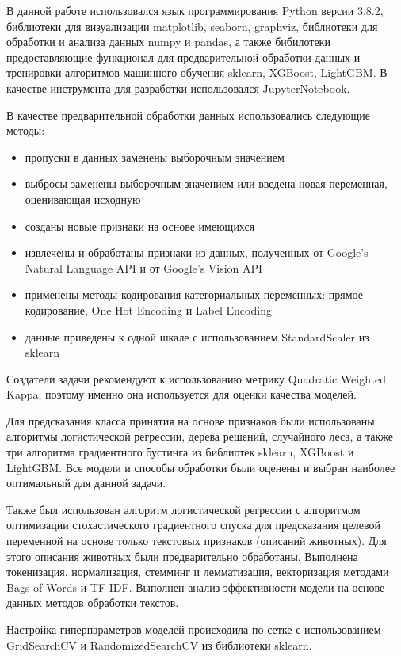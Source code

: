 \documentclass[14pt]{mmcs_article}
\begin{document}
В данной работе использовался язык программирования Python версии 3.8.2, библиотеки для визуализации matplotlib, seaborn, graphviz, библиотеки для обработки и анализа данных numpy и pandas, а также бибилотеки предоставляющие функционал для предварительной обработки данных и тренировки алгоритмов машинного обучения sklearn, XGBoost, LightGBM. В качестве инструмента для разработки использовался JupyterNotebook.

В качестве предварительной обработки данных использовались следующие методы: 
\begin{itemize}
	\item пропуски в данных заменены выборочным значением
	\item выбросы заменены выборочным значением или введена новая переменная, оценивающая исходную
	\item созданы новые признаки на основе имеющихся
	\item извлечены и обработаны признаки из данных, полученных от Google’s Natural Language API и от Google’s Vision API
	\item применены методы кодирования категориальных переменных: прямое кодирование, One Hot Encoding и Label Encoding
	\item данные приведены к одной шкале с использованием StandardScaler из sklearn
\end{itemize}

Создатели задачи рекомендуют к использованию метрику Quadratic Weighted Kappa, поэтому именно она используется для оценки качества моделей.

Для предсказания класса принятия на основе признаков были использованы алгоритмы логистической регрессии, дерева решений, случайного леса, а также три алгоритма градиентного бустинга из библиотек sklearn, XGBoost и LightGBM. Все модели и способы обработки были оценены и выбран наиболее оптимальный для данной задачи.

Также был использован алгоритм логистической регрессии с алгоритмом оптимизации стохастического градиентного спуска для предсказания целевой переменной на основе только текстовых признаков (описаний животных). Для этого описания животных были предварительно обработаны. Выполнена токенизация, нормализация, стемминг и лемматизация, векторизация методами Bags of Words и TF-IDF. Выполнен анализ эффективности модели на основе данных методов обработки текстов.

Настройка гиперпараметров моделей происходила по сетке с использованием GridSearchCV и RandomizedSearchCV из библиотеки sklearn.
\end{document}
